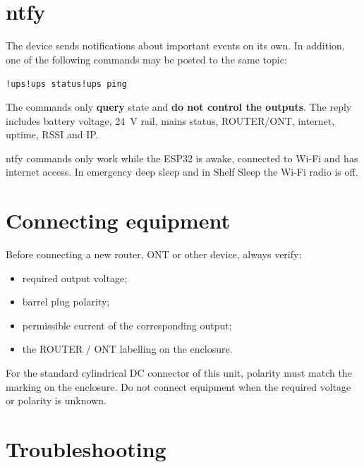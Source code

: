 \documentclass[10.5pt,a5paper]{article}
\begin{document}
\section{ntfy}

The device sends notifications about important events on its own. In addition, one of the following commands may be posted to the same topic:

\begin{center}
\texttt{!ups}\qquad \texttt{!ups status}\qquad \texttt{!ups ping}
\end{center}

The commands only \textbf{query} state and \textbf{do not control the outputs}. The reply includes battery voltage, 24~V rail, mains status, ROUTER/ONT, internet, uptime, RSSI and IP.

\begin{infobox}
ntfy commands only work while the ESP32 is awake, connected to Wi-Fi and has internet access. In emergency deep sleep and in Shelf Sleep the Wi-Fi radio is off.
\end{infobox}

\section{Connecting equipment}

Before connecting a new router, ONT or other device, always verify:
\begin{itemize}
  \item required output voltage;
  \item barrel plug polarity;
  \item permissible current of the corresponding output;
  \item the ROUTER / ONT labelling on the enclosure.
\end{itemize}

For the standard cylindrical DC connector of this unit, polarity must match the marking on the enclosure. Do not connect equipment when the required voltage or polarity is unknown.

\section{Troubleshooting}
\end{document}
